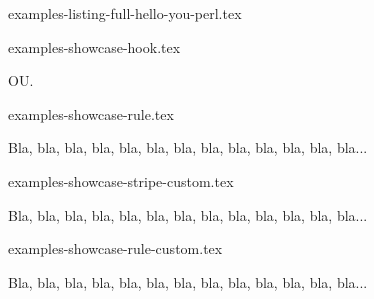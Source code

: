 \begin{filecontents*}[overwrite]{examples-listing-full-hello-you-perl.tex}
\end{filecontents*}


\begin{filecontents*}[overwrite]{examples-showcase-hook.tex}
\begin{tdocshowcase}
\end{tdocshowcase}

OU.

\begin{tdocshowcase}
\end{tdocshowcase}
\end{filecontents*}


\begin{filecontents*}[overwrite]{examples-showcase-rule.tex}
\begin{tdocshowcase}[style = rule]
    Bla, bla, bla, bla, bla, bla, bla, bla, bla, bla, bla, bla, bla...
\end{tdocshowcase}
\end{filecontents*}


\begin{filecontents*}[overwrite]{examples-showcase-stripe-custom.tex}
\begin{tdocshowcase}[style      = stripe,
                     col-stripe = green,
                     col-text   = purple,
                     before     = Mon début,
                     after      = Ma fin à moi]
    Bla, bla, bla, bla, bla, bla, bla, bla, bla, bla, bla, bla, bla...
\end{tdocshowcase}
\end{filecontents*}


\begin{filecontents*}[overwrite]{examples-showcase-rule-custom.tex}
\begin{tdocshowcase}[style      = rule,
                     col-stripe = red,
                     col-text   = orange!75!black,
                     before     = Mon début,
                     after      = Ma fin à moi]
    Bla, bla, bla, bla, bla, bla, bla, bla, bla, bla, bla, bla, bla...
\end{tdocshowcase}
\end{filecontents*}


